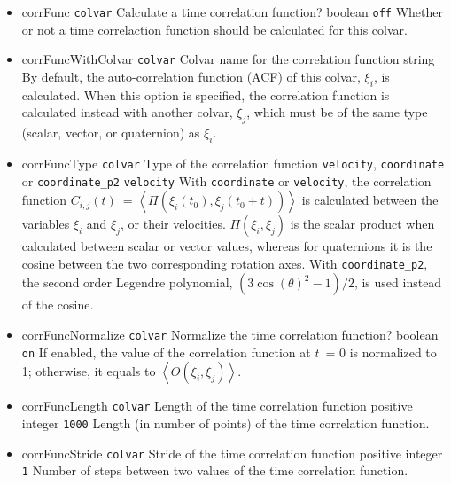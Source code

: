 \begin{itemize}

\item %
  \keydef
    {corrFunc}{%
    \texttt{colvar}}{%
    Calculate a time correlation function?}{%
    boolean}{%
    \texttt{off}}{%
    Whether or not a time correlaction function should be calculated
    for this colvar.}

\item %
  \key
    {corrFuncWithColvar}{%
    \texttt{colvar}}{%
    Colvar name for the correlation function}{%
    string}{%
    By default, the auto-correlation function (ACF) of this colvar,
    $\xi_{i}$, is calculated.  When this option is specified, the
    correlation function is calculated instead with another colvar,
    $\xi_{j}$, which must be of the same type (scalar, vector, or
    quaternion) as $\xi_{i}$.}

\item%
  \keydef
    {corrFuncType}{%
    \texttt{colvar}}{%
    Type of the correlation function}{%
    \texttt{velocity}, \texttt{coordinate} or
    \texttt{coordinate\_p2}}{%
    \texttt{velocity}}{%
    With \texttt{coordinate} or \texttt{velocity}, the correlation
    function $C_{i,j}(t)$~= $\left\langle \Pi\left(\xi_{i}(t_{0}),
        \xi_{j}(t_{0}+t)\right) \right\rangle$ is calculated between
    the variables $\xi_{i}$ and $\xi_{j}$, or their velocities.
    $\Pi(\xi_{i}, \xi_{j})$ is the scalar product when calculated
    between scalar or vector values, whereas for quaternions it is the
    cosine between the two corresponding rotation axes.  With
    \texttt{coordinate\_p2}, the second order Legendre polynomial,
    $(3\cos(\theta)^{2}-1)/2$, is used instead of the cosine.}

\item %
  \keydef
    {corrFuncNormalize}{%
    \texttt{colvar}}{%
    Normalize the time correlation function?}{%
    boolean}{%
    \texttt{on}}{%
    If enabled, the value of the correlation function at $t$~= 0
    is normalized to 1; otherwise, it equals to $\left\langle
      O\left(\xi_{i}, \xi_{j}\right) \right\rangle$.}

\item %
  \keydef
    {corrFuncLength}{%
    \texttt{colvar}}{%
    Length of the time correlation function}{%
    positive integer}{%
    \texttt{1000}}{%
    Length (in number of points) of the time correlation function.}

\item %
  \keydef
    {corrFuncStride}{%
    \texttt{colvar}}{%
    Stride of the time correlation function}{%
    positive integer}{%
    \texttt{1}}{%
    Number of steps between two values of the time correlation function.}


\end{itemize}

